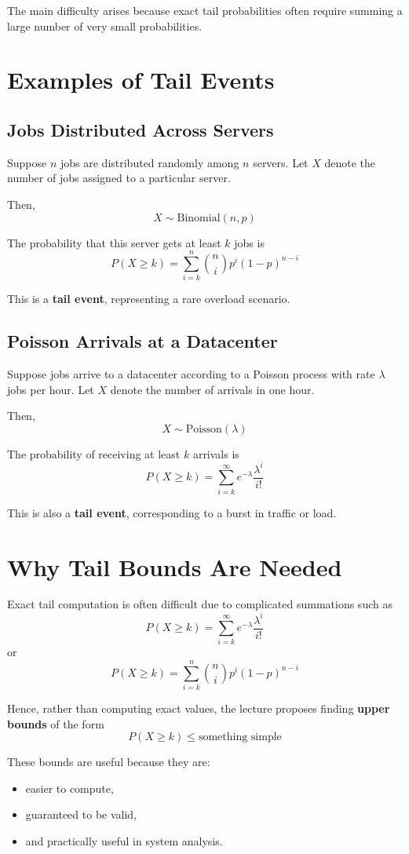 \documentclass[12pt]{article}
\begin{document}
The main difficulty arises because exact tail probabilities often require summing a large number of very small probabilities.

\section{Examples of Tail Events}

\subsection{Jobs Distributed Across Servers}
Suppose \(n\) jobs are distributed randomly among \(n\) servers. Let \(X\) denote the number of jobs assigned to a particular server.

Then,
\[
X \sim \text{Binomial}(n,p)
\]

The probability that this server gets at least \(k\) jobs is
\[
P(X \ge k)=\sum_{i=k}^{n}\binom{n}{i}p^i(1-p)^{n-i}
\]

This is a \textbf{tail event}, representing a rare overload scenario.

\subsection{Poisson Arrivals at a Datacenter}
Suppose jobs arrive to a datacenter according to a Poisson process with rate \(\lambda\) jobs per hour. Let \(X\) denote the number of arrivals in one hour.

Then,
\[
X \sim \text{Poisson}(\lambda)
\]

The probability of receiving at least \(k\) arrivals is
\[
P(X \ge k)=\sum_{i=k}^{\infty} e^{-\lambda}\frac{\lambda^i}{i!}
\]

This is also a \textbf{tail event}, corresponding to a burst in traffic or load.

\section{Why Tail Bounds Are Needed}

Exact tail computation is often difficult due to complicated summations such as
\[
P(X \ge k)=\sum_{i=k}^{\infty} e^{-\lambda}\frac{\lambda^i}{i!}
\]
or
\[
P(X \ge k)=\sum_{i=k}^{n}\binom{n}{i}p^i(1-p)^{n-i}
\]

Hence, rather than computing exact values, the lecture proposes finding \textbf{upper bounds} of the form
\[
P(X \ge k)\le \text{something simple}
\]

These bounds are useful because they are:
\begin{itemize}[leftmargin=1.5em]
    \item easier to compute,
    \item guaranteed to be valid,
    \item and practically useful in system analysis.
\end{itemize}
\end{document}
